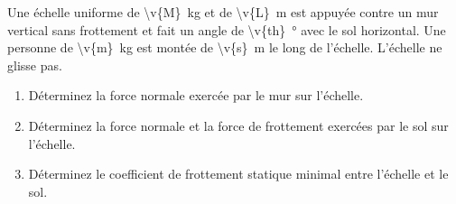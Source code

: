 \begin{minipage}{0.6\linewidth}
Une échelle uniforme de \qty{\v{M}}{kg} et de \qty{\v{L}}{m} est appuyée contre un mur vertical sans frottement et fait un angle de \qty{\v{th}}{\degree} avec le sol horizontal. Une personne de \qty{\v{m}}{kg} est montée de \qty{\v{s}}{m} le long de l'échelle. L'échelle ne glisse pas.
\end{minipage}\hfill
\begin{minipage}{0.35\linewidth}
\centering
{}
\end{minipage}

\begin{enumerate}[label=\alph*)]
    \item Déterminez la force normale exercée par le mur sur l'échelle.
    \item Déterminez la force normale et la force de frottement exercées par le sol sur l'échelle.
    \item Déterminez le coefficient de frottement statique minimal entre l'échelle et le sol.
\end{enumerate}
